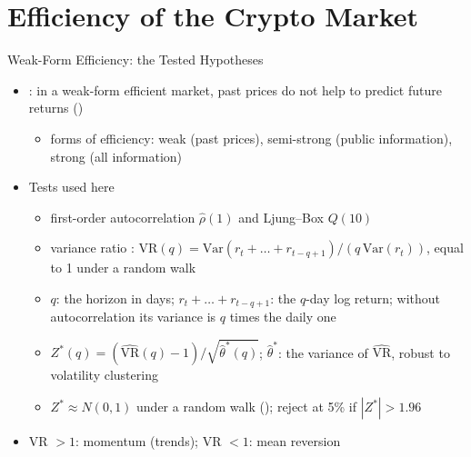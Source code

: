 \section{Efficiency of the Crypto Market}

\begin{frame}{Weak-Form Efficiency: the Tested Hypotheses}
\itemsize{\small}
\begin{itemize}
    \item {}: in a weak-form efficient market, past prices do not help to predict future returns ()
    \begin{itemize}
        \item forms of efficiency: weak (past prices), semi-strong (public information), strong (all information)
    \end{itemize}
    \item Tests used here
    \begin{itemize}
        \item first-order autocorrelation $\hat\rho(1)$ and Ljung--Box $Q(10)$
        \item variance ratio : $\mathrm{VR}(q) = \mathrm{Var}(r_t + \dots + r_{t-q+1})/(q\,\mathrm{Var}(r_t))$, equal to 1 under a random walk
        \item $q$: the horizon in days; $r_t + \dots + r_{t-q+1}$: the $q$-day log return; without autocorrelation its variance is $q$ times the daily one
        \item $Z^*(q) = (\widehat{\mathrm{VR}}(q) - 1)/\sqrt{\hat\theta^*(q)}$; $\hat\theta^*$: the variance of $\widehat{\mathrm{VR}}$, robust to volatility clustering
        \item $Z^* \approx N(0, 1)$ under a random walk (); reject at 5\% if $|Z^*| > 1.96$
    \end{itemize}
    \item VR $> 1$: momentum (trends); VR $< 1$: mean reversion
\end{itemize}
\end{frame}

